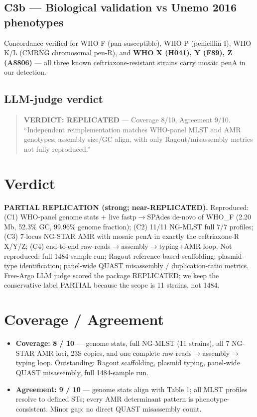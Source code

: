 \documentclass[11pt,letterpaper]{article}
\begin{document}
\subsection{C3b --- Biological validation vs Unemo 2016 phenotypes}

Concordance verified for WHO F (pan-susceptible), WHO P (penicillin I), WHO K/L (CMRNG chromosomal pen-R), and \textbf{WHO X (H041), Y (F89), Z (A8806)} --- all three known ceftriaxone-resistant strains carry mosaic penA in our detection.

\subsection{LLM-judge verdict}

\begin{quote}
\textbf{VERDICT: REPLICATED} --- Coverage 8/10, Agreement 9/10. ``Independent reimplementation matches WHO-panel MLST and AMR genotypes; assembly size/GC align, with only Ragout/misassembly metrics not fully reproduced.''
\end{quote}

\section{Verdict}

\textbf{PARTIAL REPLICATION (strong; near-REPLICATED).} Reproduced: (C1) WHO-panel genome stats + live fastp$\rightarrow$SPAdes de-novo of WHO\_F (2.20 Mb, 52.3\% GC, 99.96\% genome fraction); (C2) 11/11 NG-MLST full 7/7 profiles; (C3) 7-locus NG-STAR AMR with mosaic penA in exactly the ceftriaxone-R X/Y/Z; (C4) end-to-end raw-reads$\rightarrow$assembly$\rightarrow$typing+AMR loop. Not reproduced: full 1484-sample run; Ragout reference-based scaffolding; plasmid-type identification; panel-wide QUAST misassembly / duplication-ratio metrics. Free-Argo LLM judge scored the package REPLICATED; we keep the conservative label PARTIAL because the scope is 11 strains, not 1484.

\section{Coverage / Agreement}

\begin{itemize}[leftmargin=1.5em]
  \item \textbf{Coverage: 8 / 10} --- genome stats, full NG-MLST (11 strains), all 7 NG-STAR AMR loci, 23S copies, and one complete raw-reads$\rightarrow$assembly$\rightarrow$typing loop. Outstanding: Ragout scaffolding, plasmid typing, panel-wide QUAST misassembly, full 1484-sample run.
  \item \textbf{Agreement: 9 / 10} --- genome stats align with Table 1; all MLST profiles resolve to defined STs; every AMR determinant pattern is phenotype-consistent. Minor gap: no direct QUAST misassembly count.
\end{itemize}
\end{document}
